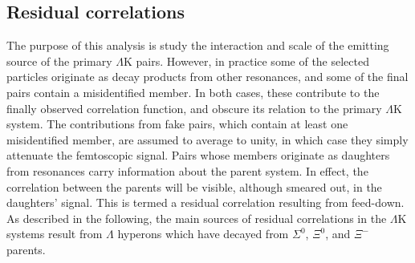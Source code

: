 \documentclass[ALICE,manyauthors]{cernphprep}
\newcommand{\Lam}{$\Lambda$\xspace}
\newcommand{\LamK}{$\Lambda$K\xspace}
\begin{document}
\subsection{Residual correlations}
\label{ResidualCorrelations}

The purpose of this analysis is study the interaction and scale of the emitting source of the primary \LamK pairs.
However, in practice some of the selected particles originate as decay products from other resonances, and some of the final pairs contain a misidentified member.
In both cases, these contribute to the finally observed correlation function, and obscure its relation to the primary \LamK system.
The contributions from fake pairs, which contain at least one misidentified member, are assumed to average to unity, in which case they simply attenuate the femtoscopic signal.
Pairs whose members originate as daughters from resonances carry information about the parent system.
In effect, the correlation between the parents will be visible, although smeared out, in the daughters' signal.
This is termed a residual correlation resulting from feed-down.  
As described in the following, the main sources of residual correlations in the \LamK systems result from \Lam hyperons which have decayed from $\Sigma^{0}$, $\Xi^{0}$, and $\Xi^{-}$ parents.
\end{document}
